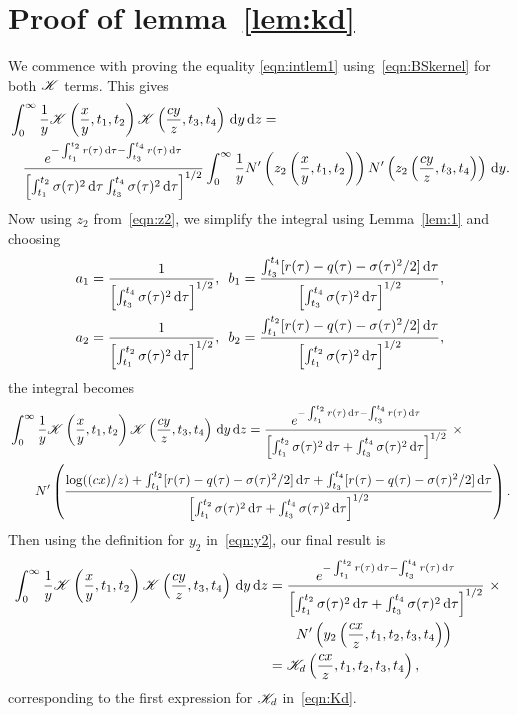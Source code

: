 \section{Proof of lemma~\ref{lem:kd}}
We commence with proving the equality \eqref{eqn:intlem1} using~\eqref{eqn:BSkernel} for both $\mathscr K$ terms. This gives
	\begin{align*}
		&\int_0^\infty \frac{1}{y}\mathscr K\left(\frac{x}{y},t_1,t_2\right)\mathscr K\left( \frac{cy}{z},t_3,t_4 \right) \, \mathrm d y \, \mathrm d z = \\
		&\quad \frac{e^{-\int_{t_1}^{t_2} r(\tau) \,\mathrm d\tau - \int_{t_3}^{t_4} r(\tau) \,\mathrm d\tau}}{\left[ \int_{t_1}^{t_2} \sigma(\tau)^2 \,\mathrm d\tau\int_{t_3}^{t_4} \sigma(\tau)^2 \,\mathrm d\tau \right]^{1/2}}\int_0^\infty \frac{1}{y} N'\left( z_2\left( \frac{x}{y}, t_1, t_2 \right) \right)N'\left( z_2\left( \frac{cy}{z}, t_3, t_4 \right) \right) \, \mathrm d y.
	\end{align*}
Now using $z_2$ from~\eqref{eqn:z2}, we simplify the integral using Lemma~\ref{lem:1} and choosing
	\begin{align*}
		&a_1 = \frac{1}{\left[ \int_{t_3}^{t_4} \sigma(\tau)^2 \,\mathrm d\tau \right]^{1/2}}, \enskip b_1 = \frac{\int_{t_3}^{t_4} [r(\tau)-q(\tau)-\sigma(\tau)^2/2] \,\mathrm d\tau }{\left[ \int_{t_3}^{t_4} \sigma(\tau)^2 \,\mathrm d\tau \right]^{1/2}}, \\
		&a_2 = \frac{1}{\left[ \int_{t_1}^{t_2} \sigma(\tau)^2 \,\mathrm d\tau \right]^{1/2}}, \enskip b_2 = \frac{\int_{t_1}^{t_2} [r(\tau)-q(\tau)-\sigma(\tau)^2/2] \,\mathrm d\tau }{\left[ \int_{t_1}^{t_2} \sigma(\tau)^2 \,\mathrm d\tau \right]^{1/2}},
	\end{align*}
the integral becomes
	\begin{align*}
		&\int_0^\infty \frac{1}{y}\mathscr K\left(\frac{x}{y},t_1,t_2\right)\mathscr K\left( \frac{cy}{z},t_3,t_4 \right) \, \mathrm d y \, \mathrm d z = \frac{e^{-\int_{t_1}^{t_2} r(\tau) \,\mathrm d\tau - \int_{t_3}^{t_4} r(\tau) \,\mathrm d\tau}}{\left[ \int_{t_1}^{t_2} \sigma(\tau)^2 \,\mathrm d\tau + \int_{t_3}^{t_4} \sigma(\tau)^2 \,\mathrm d\tau \right]^{1/2}} \ \times \ \\
		& \qquad N'\left(  \frac{\log((cx)/z) + \int_{t_1}^{t_2} [r(\tau) - q(\tau) - \sigma(\tau)^2/2] \, \mathrm d\tau + \int_{t_3}^{t_4} [r(\tau) - q(\tau) - \sigma(\tau)^2/2] \, \mathrm d\tau}{\left[\int_{t_1}^{t_2} \sigma(\tau)^2 \, \mathrm d\tau + \int_{t_3}^{t_4} \sigma(\tau)^2 \, \mathrm d\tau\right]^{1/2}} \right).
	\end{align*}
Then using the definition for $y_2$ in~\eqref{eqn:y2}, our final result is
	\begin{align*}
		\int_0^\infty \frac{1}{y}\mathscr K\left(\frac{x}{y},t_1,t_2\right)\mathscr K\left( \frac{cy}{z},t_3,t_4 \right) \, \mathrm d y \, \mathrm d z &=  \frac{e^{-\int_{t_1}^{t_2} r(\tau) \,\mathrm d\tau - \int_{t_3}^{t_4} r(\tau) \,\mathrm d\tau}}{\left[ \int_{t_1}^{t_2} \sigma(\tau)^2 \,\mathrm d\tau + \int_{t_3}^{t_4} \sigma(\tau)^2 \,\mathrm d\tau \right]^{1/2}} \ \times \ \\
		&\qquad N'\left( y_2\left( \frac{cx}{z}, t_1, t_2, t_3, t_4 \right)\right) \\
		&= \mathscr K_d\left(  \frac{cx}{z}, t_1, t_2, t_3, t_4 \right),
	\end{align*}
corresponding to the first expression for $\mathscr K_d$ in~\eqref{eqn:Kd}.

